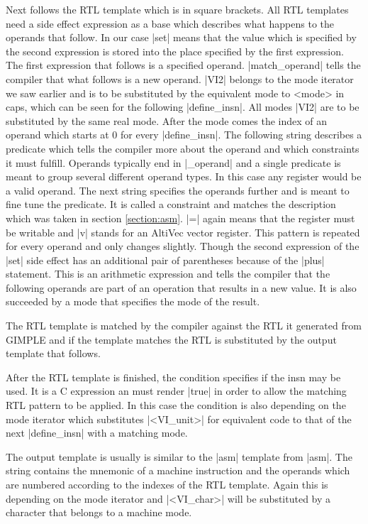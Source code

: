 Next follows the RTL template which is in square brackets.
All RTL templates need a side effect expression as a base which describes what happens to the operands that follow.
In our case |set| means that the value which is specified by the second expression is stored into the place specified by the first expression. \cite{GCCint:sideeffect}
The first expression that follows is a specified operand.
|match_operand| tells the compiler that what follows is a new operand.
|VI2| belongs to the mode iterator we saw earlier and is to be substituted by the equivalent mode to <mode> in caps, which can be seen for the following |define_insn|.
All modes |VI2| are to be substituted by the same real mode.
After the mode comes the index of an operand which starts at 0 for every |define_insn|.
The following string describes a predicate which tells the compiler more about the operand and which constraints it must fulfill.
Operands typically end in |_operand| and a single predicate is meant to group several different operand types.
In this case any register would be a valid operand. \cite{GCCint:predicates}
The next string specifies the operands further and is meant to fine tune the predicate.
It is called a constraint and matches the description which was taken in section \ref{section:asm}.
|=| again means that the register must be writable and |v| stands for an AltiVec vector register.\cite{GCCint:constraints}
This pattern is repeated for every operand and only changes slightly.
Though the second expression of the |set| side effect has an additional pair of parentheses because of the |plus| statement.
This is an arithmetic expression and tells the compiler that the following operands are part of an operation that results in a new value.
It is also succeeded by a mode that specifies the mode of the result.\cite{GCCint:arith}

The RTL template is matched by the compiler against the RTL it generated from GIMPLE and if the template matches the RTL is substituted by the output template that follows.

After the RTL template is finished, the condition specifies if the insn may be used.
It is a C expression an must render |true| in order to allow the matching RTL pattern to be applied.
In this case the condition is also depending on the mode iterator which substitutes |<VI_unit>| for equivalent code to that of the next |define_insn| with a matching mode. \cite{GCCint:defineinsn}

The output template is usually is similar to the |asm| template from |asm|.
The string contains the mnemonic of a machine instruction and the operands which are numbered according to the indexes of the RTL template.
Again this is depending on the mode iterator and |<VI_char>| will be substituted by a character that belongs to a machine mode. \cite{GCCint:defineinsn}

